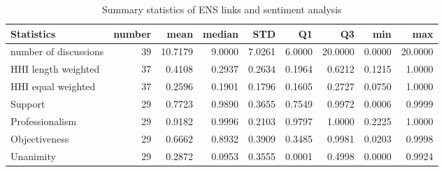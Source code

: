 \documentclass{article}
\begin{document}
\begin{table}[ht]
    \centering
    \small
\begin{tabular}{lrrrrrrrr}
\toprule
Statistics & number & mean & median & STD & Q1 & Q3 & min & max \\
\midrule
number of discussions & 39 & 10.7179 & 9.0000 & 7.0261 & 6.0000 & 20.0000 & 0.0000 & 20.0000 \\
HHI length weighted & 37 & 0.4108 & 0.2937 & 0.2634 & 0.1964 & 0.6212 & 0.1215 & 1.0000 \\
HHI equal weighted & 37 & 0.2596 & 0.1901 & 0.1796 & 0.1605 & 0.2727 & 0.0750 & 1.0000 \\
\midrule
Support & 29 & 0.7723 & 0.9890 & 0.3655 & 0.7549 & 0.9972 & 0.0006 & 0.9999 \\
Professionalism & 29 & 0.9182 & 0.9996 & 0.2103 & 0.9797 & 1.0000 & 0.2225 & 1.0000 \\
Objectiveness & 29 & 0.6662 & 0.8932 & 0.3909 & 0.3485 & 0.9981 & 0.0203 & 0.9998 \\
Unanimity & 29 & 0.2872 & 0.0953 & 0.3555 & 0.0001 & 0.4998 & 0.0000 & 0.9924 \\
\bottomrule
\end{tabular}
    \caption{Summary statistics of ENS links and sentiment analysis}
\end{table}
\end{document}
